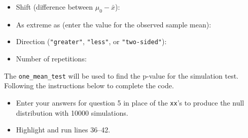 \documentclass[
]{report}
\newenvironment{Shaded}{\begin{snugshade}}{\end{snugshade}}
\newcommand{\AttributeTok}[1]{\textcolor[rgb]{0.13,0.29,0.53}{#1}}
\newcommand{\CommentTok}[1]{\textcolor[rgb]{0.56,0.35,0.01}{\textit{#1}}}
\newcommand{\DecValTok}[1]{\textcolor[rgb]{0.00,0.00,0.81}{#1}}
\newcommand{\FunctionTok}[1]{\textcolor[rgb]{0.13,0.29,0.53}{\textbf{#1}}}
\newcommand{\NormalTok}[1]{#1}
\newcommand{\SpecialCharTok}[1]{\textcolor[rgb]{0.81,0.36,0.00}{\textbf{#1}}}
\newcommand{\StringTok}[1]{\textcolor[rgb]{0.31,0.60,0.02}{#1}}
\providecommand{\tightlist}{%
  \setlength{\itemsep}{0pt}\setlength{\parskip}{0pt}}
\begin{document}
\vspace{0.15in}

\begin{itemize}
\tightlist
\item
  Shift (difference between \(\mu_0 -\bar{x}\)):
\end{itemize}

\vspace{0.15in}

\begin{itemize}
\tightlist
\item
  As extreme as (enter the value for the observed sample mean):
\end{itemize}

\vspace{.15in}

\begin{itemize}
\tightlist
\item
  Direction (\texttt{"greater"}, \texttt{"less"}, or \texttt{"two-sided"}):
\end{itemize}

\vspace{.15in}

\begin{itemize}
\tightlist
\item
  Number of repetitions:
\end{itemize}

\vspace{.15in}

The \texttt{one\_mean\_test} will be used to find the p-value for the simulation test. Following the instructions below to complete the code.

\begin{itemize}
\item
  Enter your answers for question 5 in place of the \texttt{xx}'s to produce the null distribution with 10000 simulations.
\item
  Highlight and run lines 36--42.
\end{itemize}

\begin{Shaded}
\end{Shaded}
\end{document}
